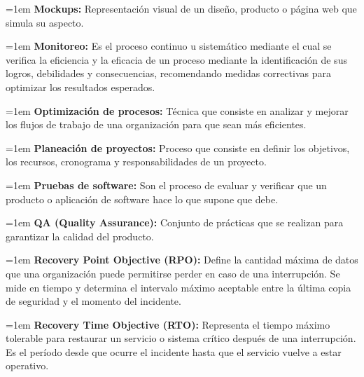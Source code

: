\documentclass[12pt,letterpaper,spanish, xcolor=table]{report}
\numberwithin{figure}{subsection}
\begin{document}
	{\leftskip=1em 
		\noindent 
		\textbf{Mockups:} Representación visual de un diseño, producto o página web que simula su aspecto.\\
	\par}
	
	
	{\leftskip=1em 
		\noindent 
		\textbf{Monitoreo:} Es el proceso continuo u sistemático mediante el cual se verifica la eficiencia y la eficacia de un proceso mediante la identificación de sus logros, debilidades y consecuencias, recomendando medidas correctivas para optimizar los resultados esperados. \\
	\par}
	
	
	{\leftskip=1em 
		\noindent 
		\textbf{Optimización de procesos:} Técnica que consiste en analizar y mejorar los flujos de trabajo de una organización para que sean más eficientes.\\
	\par}
	
	
	{\leftskip=1em 
		\noindent 
		\textbf{Planeación de proyectos:} Proceso que consiste en definir los objetivos, los recursos, cronograma y responsabilidades de un proyecto.\\
	\par}
	
	
	{\leftskip=1em 
		\noindent 
		\textbf{Pruebas de software:} Son el proceso de evaluar y verificar que un producto o aplicación de software hace lo que supone que debe.\\
	\par}
	
	
	{\leftskip=1em 
		\noindent 
		\textbf{QA (Quality Assurance):} Conjunto de prácticas que se realizan para garantizar la calidad del producto.\\
	\par}
	
	{\leftskip=1em 
		\noindent 
		\textbf{Recovery Point Objective (RPO):} Define la cantidad máxima de datos que una organización puede permitirse perder en caso de una interrupción. Se mide en tiempo y determina el intervalo máximo aceptable entre la última copia de seguridad y el momento del incidente.\\
	\par}
	
	{\leftskip=1em 
		\noindent 
		\textbf{Recovery Time Objective (RTO):} Representa el tiempo máximo tolerable para restaurar un servicio o sistema crítico después de una interrupción. Es el período desde que ocurre el incidente hasta que el servicio vuelve a estar operativo.\\
	\par}
	
\end{document}
